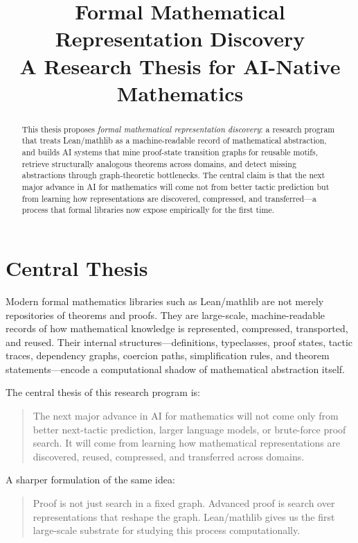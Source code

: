 \documentclass[12pt, a4paper]{article}
\title{\textbf{Formal Mathematical Representation Discovery}\\[0.4em]
       \large A Research Thesis for AI-Native Mathematics}
\author{}
\date{}
\begin{document}
\maketitle

\begin{abstract}
This thesis proposes \emph{formal mathematical representation discovery}: a
research program that treats Lean/mathlib as a machine-readable record of
mathematical abstraction, and builds AI systems that mine proof-state
transition graphs for reusable motifs, retrieve structurally analogous
theorems across domains, and detect missing abstractions through
graph-theoretic bottlenecks. The central claim is that the next major advance
in AI for mathematics will come not from better tactic prediction but from
learning how representations are discovered, compressed, and
transferred---a process that formal libraries now expose empirically for the
first time.
\end{abstract}

\section{Central Thesis}

Modern formal mathematics libraries such as Lean/mathlib
\citep{mathlib2020} are not merely repositories of theorems and proofs.
They are large-scale, machine-readable records of how mathematical knowledge
is represented, compressed, transported, and reused. Their internal
structures---definitions, typeclasses, proof states, tactic traces,
dependency graphs, coercion paths, simplification rules, and theorem
statements---encode a computational shadow of mathematical abstraction
itself.

The central thesis of this research program is:

\begin{quote}
The next major advance in AI for mathematics will not come only from better
next-tactic prediction, larger language models, or brute-force proof search.
It will come from learning how mathematical representations are discovered,
reused, compressed, and transferred across domains.
\end{quote}

A sharper formulation of the same idea:

\begin{quote}
Proof is not just search in a fixed graph. Advanced proof is search over
representations that reshape the graph. Lean/mathlib gives us the first
large-scale substrate for studying this process computationally.
\end{quote}
\end{document}
